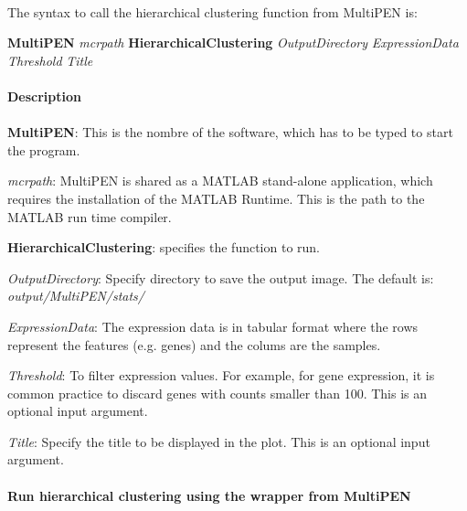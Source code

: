 \documentclass[11pt, oneside]{article}   	%
\begin{document}
\paragraph{}

The syntax to call the hierarchical clustering function from MultiPEN is:

\begin{framed}
   {\bf MultiPEN} {\it mcrpath} {\bf HierarchicalClustering} {\it OutputDirectory} 
   {\it ExpressionData} {\it Threshold} {\it Title}
\end{framed}


\paragraph{Description}
\paragraph{}


{\bf MultiPEN}:  This is the nombre of the software, which has to be typed to start the program.

{\it mcrpath}: MultiPEN is shared as a MATLAB stand-alone application, which requires the installation of the MATLAB Runtime. This is the path to the MATLAB run time compiler.

{\bf HierarchicalClustering}: specifies the function to run.

{\it OutputDirectory}:  Specify directory to save the output image. The default is: {\it output/MultiPEN/stats/} 

{\it ExpressionData}: The expression data is in tabular format where the rows represent the features (e.g. genes) and the colums are the samples. 

{\it Threshold}: To filter expression values. For example, for gene expression, it is common practice to discard genes with counts smaller than 100. This is an optional input argument.

{\it Title}: Specify the title to be displayed in the plot. This is an optional input argument.




\paragraph{Run hierarchical clustering using the wrapper from MultiPEN}
\paragraph{}
\end{document}
